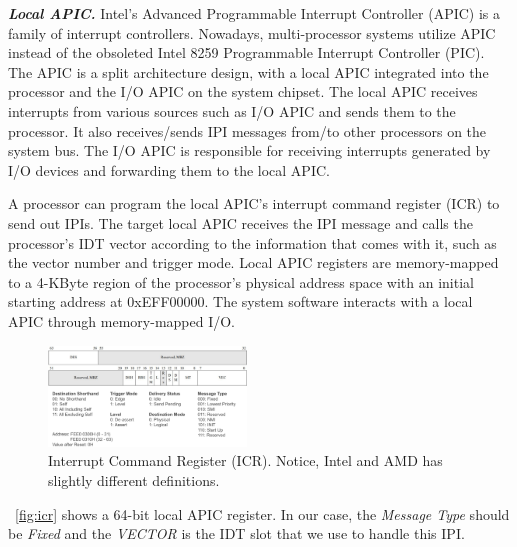%
%
%




\textbf{\textit{Local APIC.}} Intel's Advanced Programmable Interrupt Controller (APIC) is a family of interrupt controllers. Nowadays, multi-processor systems utilize APIC instead of the obsoleted Intel 8259 Programmable Interrupt Controller (PIC). The APIC is a split architecture design, with a local APIC integrated into the processor and the I/O APIC on the system chipset. The local APIC receives interrupts from various sources such as I/O APIC and sends them to the processor. It also receives/sends IPI messages from/to other processors on the system bus. The I/O APIC is responsible for receiving interrupts generated by I/O devices and forwarding them to the local APIC. 

A processor can program the local APIC's interrupt command register (ICR) to send out IPIs. The target local APIC receives the IPI message and calls the processor's IDT vector according to the information that comes with it, such as the vector number and trigger mode. Local APIC registers are memory-mapped to a 4-KByte region of the processor's physical address space with an initial starting address at 0xEFF00000. The system software interacts with a local APIC through memory-mapped I/O. 


\begin{figure}[th]
  \includegraphics[width=0.47\textwidth]{figures/icr2}
  \centering
  \caption{Interrupt Command Register (ICR). Notice, Intel and AMD has slightly different definitions.~\cite{intelapic}~\cite{amdapic}}
  \label{fig:icr}
\end{figure}



~\autoref{fig:icr} shows a 64-bit local APIC register.  In our case, the \textit{Message Type} should be \textit{Fixed} and the \textit{VECTOR} is the IDT slot that we use to handle this IPI.
